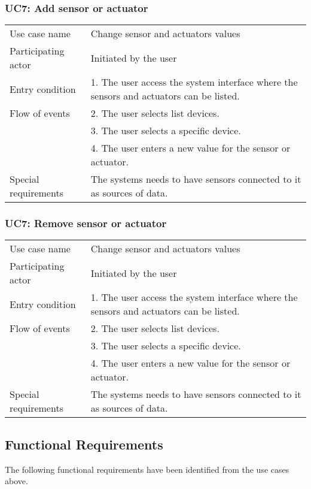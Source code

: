 \subsubsection{UC7: Add  sensor or actuator}
\label{sec:notify}
\begin{tabular}{ l p{11cm} }
	\hline                       
	Use case name & Change sensor and actuators values\\
	Participating actor & Initiated by the user\\
	Entry condition & 1. The user access the system interface where the sensors and actuators can be listed. \\
	Flow of events & 2. The user selects list devices. \\
	& 3. The user selects a  specific device. \\
	& 4. The user enters a new value for the sensor or actuator. \\
	Special requirements & The systems needs to have sensors connected to it as sources of data.\\
	\hline
\end{tabular}


\subsubsection{UC7: Remove sensor or actuator}
\label{sec:notify}
\begin{tabular}{ l p{11cm} }
	\hline                       
	Use case name & Change sensor and actuators values\\
	Participating actor & Initiated by the user\\
	Entry condition & 1. The user access the system interface where the sensors and actuators can be listed. \\
	Flow of events & 2. The user selects list devices. \\
	& 3. The user selects a  specific device. \\
	& 4. The user enters a new value for the sensor or actuator. \\
	Special requirements & The systems needs to have sensors connected to it as sources of data.\\
	\hline
\end{tabular}

\subsection{Functional Requirements}

The following functional requirements have been identified from the use cases above.\\

